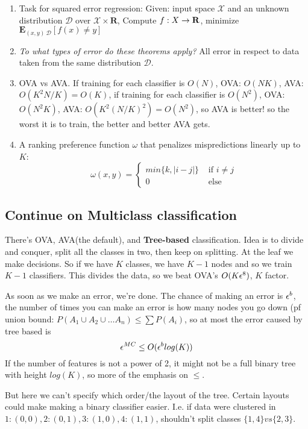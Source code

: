 \begin{enumerate}
\item Task for squared error regression: Given: input space $\mathcal{X}$
  and an unknown distribution $\mathcal{D}$ over $\mathcal{X}\times\mathbf{R}$, Compute $f:X\rightarrow
  \mathbf{R}$, minimize $\mathbf{E}_{(x,y)~\mathcal{D}}[f(x)\neq y]$
\item \emph{To what types of error do these theorems apply?} All error
  in respect to data taken from the same distribution $\mathcal{D}$.
\item OVA vs AVA. If training for each classifier is $O(N)$, OVA:
  $O(NK)$, AVA:$O(K^2N/K) = O(K)$, if training for each classifier is
  $O(N^2)$, OVA: $O(N^2K)$, AVA: $O(K^2(N/K)^2)=O(N^2)$, so AVA is
  better! so the worst it is to train, the better and better AVA gets.
\item A ranking preference function $\omega$ that penalizes
  mispredictions linearly up to $K$: 
$$\omega(x,y) =
\begin{cases}
  min\{k, |i-j|\} & \text{ if $i\neq j$}\\
  0 & \text{ else}
\end{cases}$$
\end{enumerate}

\subsection{Continue on Multiclass classification}
\label{sec:multiclass}

There's OVA, AVA(the default), and \textbf{Tree-based}
classification. Idea is to divide and conquer, split all the classes
in two, then keep on splitting. At the leaf we make decisions. So if
we have $K$ classes, we have $K-1$ nodes and so we train $K-1$
classifiers. This divides the data, so we beat OVA's $O(K\epsilon^8)$, $K$
factor.

As soon as we make an error, we're done. The chance of making an error
is $\epsilon^b$, the number of times you can make an error is how many
nodes you go down (pf union bound: $P(A_1\cup A_2\cup \dots A_n) \le
\sum P(A_i)$, so at most the error caused by tree based is
$$\epsilon^{MC}\le O(\epsilon^blog(K))$$
If the number of features is not a power of 2, it might not be a full
binary tree with height $log(K)$, so more of the emphasis on $\le$.

But here we can't specify which order/the layout of the tree. Certain
layouts could make making a binary classifier easier. I.e. if data
were clustered in $1:(0,0), 2:(0,1), 3:(1,0), 4:(1,1)$, shouldn't
split classes $\{1,4\} vs \{2,3\}$.

